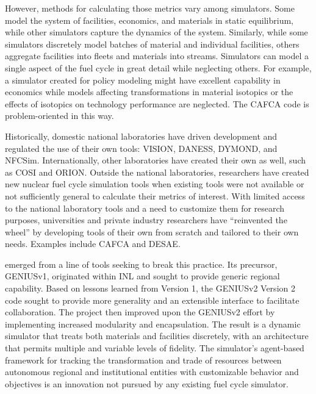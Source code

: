 However, methods for calculating those metrics vary among simulators. Some
model the system of facilities, economics, and materials in static equilibrium,
while other simulators capture the dynamics of the system.  Similarly, while
some simulators discretely model batches of material and individual facilities,
others aggregate facilities into fleets and materials into streams. Simulators
can model a single aspect of the fuel cycle in great detail while neglecting
others. For example, a simulator created for policy modeling might have
excellent capability in economics while models affecting transformations in
material isotopics or the effects of isotopics on technology performance are
neglected.  The \gls{CAFCA}\cite{guerin_impact_2009} code is problem-oriented
in this way.

Historically, domestic national laboratories have driven development and regulated
the use of their own tools: \gls{VISION}\cite{jacobson_verifiable_2010},
\gls{DANESS}\cite{van_den_durpel_daness_2009},
\gls{DYMOND}\cite{yacout_modeling_2005}, and
\gls{NFCSim}\cite{schneider_nfcsim:_2005,allan_guidance_2008}.
Internationally, other laboratories have created their own as well, such as
\gls{COSI}\cite{boucher_cosi_2005,boucher_cosi:_2006,meyer_new_2009,coquelet-pascal_comparison_2011}
and
\gls{ORION}\cite{worrall_scenario_2007}.
Outside the national laboratories,
researchers have created new nuclear fuel cycle simulation tools when existing
tools were not available or not sufficiently general to calculate their metrics
of interest.  With limited access to the national
laboratory tools and a need to customize them for research purposes,
universities and private industry researchers have ``reinvented the wheel'' by
developing tools of their own from scratch and tailored to their own needs.
Examples include \gls{CAFCA}\cite{guerin_benchmark_2009} and
\gls{DESAE}\cite{andrianova_desae_2008,mccarthy_benchmark_2012,allan_guidance_2008}.

\Cyclus emerged from a line of tools seeking to break this practice.  Its
precursor,
\gls{GENIUSv1}\cite{dunzik-gougar_global_2007,jain_transitioning_2006},
originated within \gls{INL} and sought to provide generic regional capability.
Based on lessons learned from Version 1, the \acrshort{GENIUSv2} Version
2\cite{oliver_studying_2009,huff_geniusv2_2009} code sought to provide more
generality and an extensible interface to facilitate collaboration.  The
\Cyclus project then improved upon the \acrshort{GENIUSv2} effort by
implementing increased modularity and encapsulation.  The result is a dynamic
simulator that treats both materials and facilities discretely, with an
architecture that permits multiple and variable levels of fidelity. The
simulator's agent-based framework for tracking the transformation and trade of
resources between autonomous regional and institutional entities with
customizable behavior and objectives is an innovation not pursued by any
existing fuel cycle simulator.


